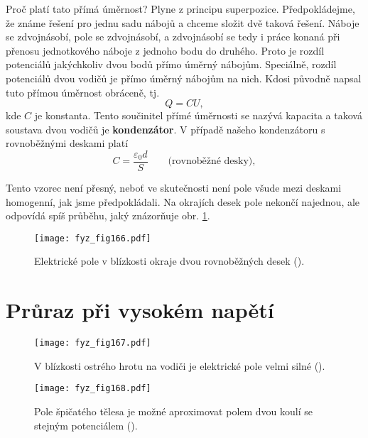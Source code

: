   Proč platí tato přímá úměrnost? Plyne z principu superpozice. Předpokládejme, že známe řešení pro 
  jednu sadu nábojů a chceme složit dvě taková řešení. Náboje se zdvojnásobí, pole se zdvojnásobí, 
  a zdvojnásobí se tedy i práce konaná při přenosu jednotkového náboje z jednoho bodu do druhého. 
  Proto je rozdíl potenciálů jakýchkoliv dvou bodů přímo úměrný nábojům. Speciálně, rozdíl 
  potenciálů dvou vodičů je přímo úměrný nábojům na nich. Kdosi původně napsal tuto přímou úměrnost 
  obráceně, tj.
  \begin{equation}\label{fyz:eq294}
    Q = CU,
  \end{equation}
  kde \(C\) je konstanta. Tento součinitel přímé úměrnosti se nazývá kapacita a taková soustava 
  dvou vodičů je \textbf{kondenzátor}. V případě našeho kondenzátoru s rovnoběžnými deskami platí
  \begin{equation}\label{fyz:eq295}
    C = \frac{\varepsilon_0d}{S} \qquad\text{(rovnoběžné desky)},
  \end{equation}
  
  Tento vzorec není přesný, neboť ve skutečnosti není pole všude mezi deskami homogenní, jak jsme 
  předpokládali. Na okrajích desek pole nekončí najednou, ale odpovídá spíš průběhu,
  jaký znázorňuje obr. \ref{fyz:fig166}.
  
  \begin{figure}[ht!]  %
    \centering
    \texttt{[image: fyz\_fig166.pdf]}
    \caption{Elektrické pole v blízkosti okraje dvou rovnoběžných desek
             (\cite[s.~115]{Feynman02}).}
    \label{fyz:fig166}
  \end{figure}
  
\section{Průraz při vysokém napětí}\label{fyz:IIchapVsecXX}

  \begin{figure}[ht!]  %
    \centering
    \texttt{[image: fyz\_fig167.pdf]}
    \caption{V blízkosti ostrého hrotu na vodiči je elektrické pole velmi silné
             (\cite[s.~116]{Feynman02}).}
    \label{fyz:fig167}
  \end{figure}
    
  \begin{figure}[ht!]  %
    \centering
    \texttt{[image: fyz\_fig168.pdf]}
    \caption{Pole špičatého tělesa je možné aproximovat polem dvou koulí se stejným potenciálem
             (\cite[s.~116]{Feynman02}).}
    \label{fyz:fig168}
  \end{figure}
  
